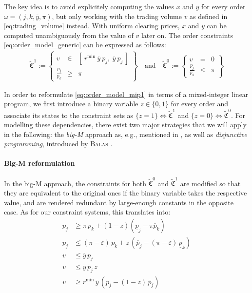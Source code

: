 \documentclass[11pt,parskip=full]{scrartcl}%
\newcommand*{\eg}{e.g., }
\newcommand*{\Min}{\mathrm{min}}
\begin{document}
The key idea is to avoid explicitely computing the values $ x $ and $ y $ for every order
$ \omega = (j,k,\overline{y},\pi) $, but only working with the trading volume $ v $ as
defined in \eqref{eq:trading_volume} instead.
With uniform clearing prices, $ x $ and $ y $ can be computed unambiguously from the value of $ v $
later on.
The order constraints \eqref{eq:order_model_generic} can be expressed as follows:
\begin{align}
  \tilde{\mathfrak{C}}^1 := \left\{
  \begin{array}{rlll}
    v &\in & [\>r^\Min \> \overline{y} \> p_j, \>\overline{y} \> p_j \>] \\[1mm]
    \frac{p_j}{p_k} &\ge & \pi
  \end{array}
  \right\}
  \quad
  \text{and}
  \quad
  \tilde{\mathfrak{C}}^0 := \left\{
  \begin{array}{rll}
    v &= & 0 \\[1mm]
    \frac{p_j}{p_k} &< & \pi
  \end{array}
  \right\}
  \label{eq:order_model_mip1}
\end{align}

In order to reformulate \eqref{eq:order_model_mip1} in terms of a mixed-integer linear program,
we first introduce a binary variable $ z \in \{0,1\} $ for every order and associate its states to
the constraint sets as $ \{z = 1\} \Leftrightarrow \tilde{\mathfrak{C}}^1 $ and
$ \{z = 0\} \Leftrightarrow \tilde{\mathfrak{C}}^0 $.
For modelling these dependencies, there exist two major strategies that we will apply in the
following:
the \emph{big-M} approach as, \eg mentioned in \cite{BONAMI-ET-AL_2015:indicator-constraints},
as well as \emph{disjunctive programming}, introduced by \textsc{Balas} \cite{BALAS_1979:DP}.

\paragraph{Big-M reformulation}

In the big-M approach, the constraints for both $ \tilde{\mathfrak{C}}^0 $ and
$ \tilde{\mathfrak{C}}^1 $ are modified so that they are equivalent to the original ones if the
binary variable takes the respective value, and are rendered redundant by large-enough constants in
the opposite case.
As for our constraint systems, this translates into:
\begin{subequations}
\begin{align}
  p_j &\ge \pi \, p_k + (1-z) (\underline{p}_j - \pi \overline{p}_k) \\
  p_j &\le (\pi-\varepsilon) \, p_k
    + z \, (\overline{p}_j - (\pi-\varepsilon) \, \underline{p}_k) \\[1mm]
  v &\le \overline{y} \, p_j \\
  v &\le \overline{y} \, \overline{p}_j \, z \\
  v &\ge r^\Min \, \overline{y} \, (p_j - (1-z) \, \overline{p}_j)
\end{align}
\label{eq:order_model_mip1_bigM}
\end{subequations}
\end{document}
